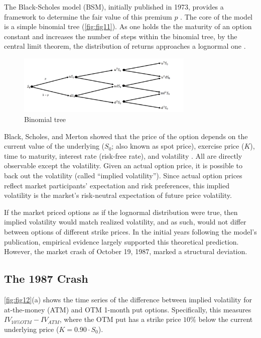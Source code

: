 The Black-Scholes model (BSM), initially published in 1973, provides a framework to determine the fair value of this premium $p$ \citep{black1973pricing}. The core of the model is a simple binomial tree (\autoref{fig:fig11}). As one holds the the maturity of an option constant and increases the number of steps within the binomial tree, by the central limit theorem, the distribution of returns approaches a lognormal one \citep{cox1979option}.

\begin{figure}[h]
    \centering
    \includegraphics[width=0.75\textwidth]{fig11.png}
    \caption{Binomial tree}
    \label{fig:fig11}
\end{figure}

Black, Scholes, and Merton showed that the price of the option depends on the current value of the underlying ($S_0$; also known as spot price), exercise price ($K$), time to maturity, interest rate (risk-free rate), and volatility \citep{black1973pricing, merton1971theory}. All are directly observable except the volatility. Given an actual option price, it is possible to back out the volatility (called “implied volatility”). Since actual option prices reflect market participants’ expectation and risk preferences, this implied volatility is the market’s risk-neutral expectation of future price volatility.

If the market priced options as if the lognormal distribution were true, then implied volatility would match realized volatility, and as such, would not differ between options of different strike prices. In the initial years following the model’s publication, empirical evidence largely supported this theoretical prediction. However, the market crash of October 19, 1987, marked a structural deviation. 


\subsection{The 1987 Crash}
\autoref{fig:fig12}(a) \citep{benzoni2011explaining} shows the time series of the difference between implied volatility for at-the-money (ATM) and OTM 1-month put options. Specifically, this measures ${IV}_{10\% OTM} - {IV}_{ATM}$, where the OTM put has a strike price $10\%$ below the current underlying price ($K = 0.90 \cdot S_0$).


